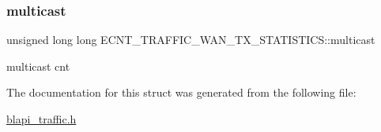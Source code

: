 \subsubsection{\texorpdfstring{multicast}{multicast}}
{\footnotesize\ttfamily unsigned long long E\+C\+N\+T\+\_\+\+T\+R\+A\+F\+F\+I\+C\+\_\+\+W\+A\+N\+\_\+\+T\+X\+\_\+\+S\+T\+A\+T\+I\+S\+T\+I\+C\+S\+::multicast}

multicast cnt 

The documentation for this struct was generated from the following file\+:\begin{DoxyCompactItemize}
\item 
\hyperlink{blapi__traffic_8h}{blapi\+\_\+traffic.\+h}\end{DoxyCompactItemize}
